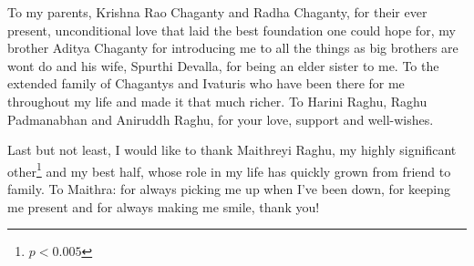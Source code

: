 To my parents, Krishna Rao Chaganty and Radha Chaganty, for their ever present, unconditional love that laid the best foundation one could hope for, my brother Aditya Chaganty for introducing me to all the things as big brothers are wont do and his wife, Spurthi Devalla, for being an elder sister to me.
To the extended family of Chagantys and Ivaturis who have been there for me throughout my life and made it that much richer.
To Harini Raghu, Raghu Padmanabhan and Aniruddh Raghu, for your love, support and well-wishes.

Last but not least, I would like to thank Maithreyi Raghu, my highly significant other\footnote{$p < 0.005$} and my best half, whose role in my life has quickly grown from friend to family.
To Maithra: for always picking me up when I've been down, for keeping me present and for always making me smile, thank you!
